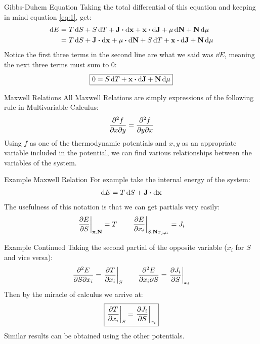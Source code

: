 \documentclass{beamer}
\begin{document}
\begin{frame}{Gibbs-Duhem Equation}
  Taking the total differential of this equation and keeping in mind equation \eqref{eq:1}, get:
  \begin{align*}
    \dd{E}&=T\dd{S}+S\dd{T}+\vb{J\vdot\dd{x}+x\vdot\dd{J}+\mu\dd{N}+N\dd{\mu}}\\
    &=T\dd{S}+\vb{J\vdot\dd{x}+\mu\vdot\dd{N}}
    +S\dd{T}+\vb{x\vdot\dd{J}+N\dd{\mu}}
  \end{align*}
  Notice the first three terms in the second line are what we said was $\dd{E}$, meaning the next three terms must sum to $0$:
  \begin{align*}
    \boxed{0=S\dd{T}+\vb{x\vdot\dd{J}+N\dd{\mu}}}
  \end{align*}
\end{frame}
\begin{frame}{Maxwell Relations}
  All Maxwell Relations are simply expressions of the following rule in Multivariable Calculus:
  \begin{align*}
    \pdv{f}{x}{y}=\pdv{f}{y}{x}
  \end{align*}
  Using $f$ as one of the thermodynamic potentials and $x,y$ as an appropriate variable included in the potential, we can find various relationships between the variables of the system.
\end{frame}
\begin{frame}{Example Maxwell Relation}
  For example take the internal energy of the system:
  \begin{align*}
    \dd{E}=T\dd{S}+\vb{J\vdot\dd{x}}
  \end{align*}
  The usefulness of this notation is that we can get partials very easily:
  \begin{align*}
    \eval{\pdv{E}{S}}_{\vb{x,N}}=T\qquad
    \eval{\pdv{E}{x_i}}_{S,\vb{N}x_{j\neq i}}=J_i
  \end{align*}
\end{frame}
\begin{frame}{Example Continued}
  Taking the second partial of the opposite variable ($x_i$ for $S$ and vice versa):
  \begin{align*}
    \pdv{E}{S}{x_i}=\eval{\pdv{T}{x_i}}_{S}\qquad
    \pdv{E}{x_i}{S}=\eval{\pdv{J_i}{S}}_{x_i}
  \end{align*}
  Then by the miracle of calculus we arrive at:
  \begin{align*}
    \boxed{\eval{\pdv{T}{x_i}}_{S}=\eval{\pdv{J_i}{S}}_{x_i}}
  \end{align*}
  Similar results can be obtained using the other potentials. 
\end{frame}
\end{document}
